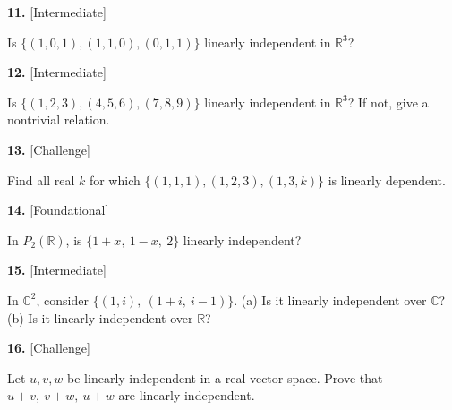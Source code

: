\documentclass[11pt]{article}
\begin{document}
\begin{minipage}{\linewidth}\textbf{11.} \hfill{\scriptsize\color{ink}[Intermediate]}\par\nopagebreak Is $\{(1,0,1),(1,1,0),(0,1,1)\}$ linearly independent in $\mathbb{R}^{3}$?
\vspace{4.0cm}\end{minipage}\par\vspace{4pt}
\begin{minipage}{\linewidth}\textbf{12.} \hfill{\scriptsize\color{ink}[Intermediate]}\par\nopagebreak Is $\{(1,2,3),(4,5,6),(7,8,9)\}$ linearly independent in $\mathbb{R}^{3}$? If not, give a nontrivial relation.
\vspace{4.0cm}\end{minipage}\par\vspace{4pt}
\begin{minipage}{\linewidth}\textbf{13.} \hfill{\scriptsize\color{ink}[Challenge]}\par\nopagebreak Find all real $k$ for which $\{(1,1,1),(1,2,3),(1,3,k)\}$ is linearly dependent.
\vspace{4.6cm}\end{minipage}\par\vspace{4pt}
\begin{minipage}{\linewidth}\textbf{14.} \hfill{\scriptsize\color{ink}[Foundational]}\par\nopagebreak In $P_{2}(\mathbb{R})$, is $\{1+x,\ 1-x,\ 2\}$ linearly independent?
\vspace{3.0cm}\end{minipage}\par\vspace{4pt}
\begin{minipage}{\linewidth}\textbf{15.} \hfill{\scriptsize\color{ink}[Intermediate]}\par\nopagebreak In $\mathbb{C}^{2}$, consider $\{(1,i),\ (1+i,\ i-1)\}$. (a) Is it linearly independent over $\mathbb{C}$? (b) Is it linearly independent over $\mathbb{R}$?
\vspace{5.0cm}\end{minipage}\par\vspace{4pt}
\begin{minipage}{\linewidth}\textbf{16.} \hfill{\scriptsize\color{ink}[Challenge]}\par\nopagebreak Let $u,v,w$ be linearly independent in a real vector space. Prove that $u+v,\ v+w,\ u+w$ are linearly independent.
\vspace{5.0cm}\end{minipage}\par\vspace{4pt}
\end{document}
